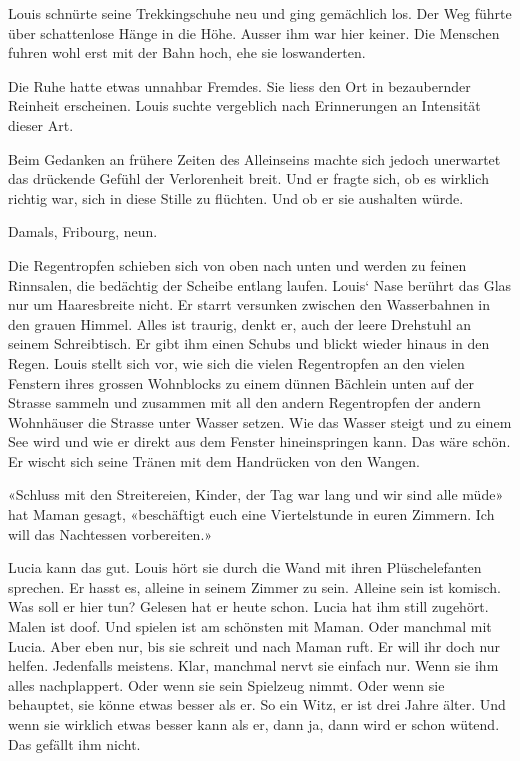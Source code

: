 Louis schnürte seine Trekkingschuhe neu und ging gemächlich los. Der Weg
führte über schattenlose Hänge in die Höhe. Ausser ihm war hier keiner.
Die Menschen fuhren wohl erst mit der Bahn hoch, ehe sie loswanderten.

Die Ruhe hatte etwas unnahbar Fremdes. Sie liess den Ort in bezaubernder
Reinheit erscheinen. Louis suchte vergeblich nach Erinnerungen an
Intensität dieser Art.

Beim Gedanken an frühere Zeiten des Alleinseins machte sich jedoch
unerwartet das drückende Gefühl der Verlorenheit breit. Und er fragte
sich, ob es wirklich richtig war, sich in diese Stille zu flüchten. Und
ob er sie aushalten würde.

Damals, Fribourg, neun.

Die Regentropfen schieben sich von oben nach unten und werden zu feinen
Rinnsalen, die bedächtig der Scheibe entlang laufen. Louis` Nase berührt
das Glas nur um Haaresbreite nicht. Er starrt versunken zwischen den
Wasserbahnen in den grauen Himmel. Alles ist traurig, denkt er, auch der
leere Drehstuhl an seinem Schreibtisch. Er gibt ihm einen Schubs und
blickt wieder hinaus in den Regen. Louis stellt sich vor, wie sich die
vielen Regentropfen an den vielen Fenstern ihres grossen Wohnblocks zu
einem dünnen Bächlein unten auf der Strasse sammeln und zusammen mit all
den andern Regentropfen der andern Wohnhäuser die Strasse unter Wasser
setzen. Wie das Wasser steigt und zu einem See wird und wie er direkt
aus dem Fenster hineinspringen kann. Das wäre schön. Er wischt sich
seine Tränen mit dem Handrücken von den Wangen.

«Schluss mit den Streitereien, Kinder, der Tag war lang und wir sind
alle müde» hat Maman gesagt, «beschäftigt euch eine Viertelstunde in
euren Zimmern. Ich will das Nachtessen vorbereiten.»

Lucia kann das gut. Louis hört sie durch die Wand mit ihren
Plüschelefanten sprechen. Er hasst es, alleine in seinem Zimmer zu sein.
Alleine sein ist komisch. Was soll er hier tun? Gelesen hat er heute
schon. Lucia hat ihm still zugehört. Malen ist doof. Und spielen ist am
schönsten mit Maman. Oder manchmal mit Lucia. Aber eben nur, bis sie
schreit und nach Maman ruft. Er will ihr doch nur helfen. Jedenfalls
meistens. Klar, manchmal nervt sie einfach nur. Wenn sie ihm alles
nachplappert. Oder wenn sie sein Spielzeug nimmt. Oder wenn sie
behauptet, sie könne etwas besser als er. So ein Witz, er ist drei Jahre
älter. Und wenn sie wirklich etwas besser kann als er, dann ja, dann
wird er schon wütend. Das gefällt ihm nicht.

